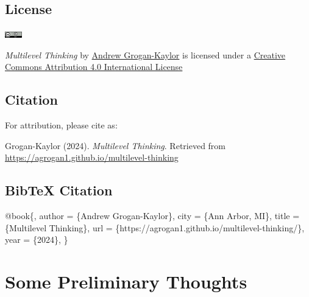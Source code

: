 \documentclass[
  letterpaper,
  DIV=11,
  numbers=noendperiod]{scrreprt}
\newenvironment{Shaded}{\begin{snugshade}}{\end{snugshade}}
\newcommand{\NormalTok}[1]{\textcolor[rgb]{0.00,0.23,0.31}{#1}}
\begin{document}

\section*{License}\label{license}


\includegraphics[width=0.29in,height=\textheight]{88x31.png}

\emph{Multilevel Thinking} by \href{https://agrogan1.github.io/}{Andrew
Grogan-Kaylor} is licensed under a
\href{http://creativecommons.org/licenses/by/4.0/}{Creative Commons
Attribution 4.0 International License}

\section*{Citation}\label{citation}


For attribution, please cite as:

Grogan-Kaylor (2024). \emph{Multilevel Thinking}. Retrieved from
\url{https://agrogan1.github.io/multilevel-thinking}

\section*{BibTeX Citation}\label{bibtex-citation}


\begin{Shaded}
\begin{Highlighting}[]
\NormalTok{@book\{,}
\NormalTok{   author = \{Andrew Grogan{-}Kaylor\},}
\NormalTok{   city = \{Ann Arbor, MI\},}
\NormalTok{   title = \{Multilevel Thinking\},}
\NormalTok{   url = \{https://agrogan1.github.io/multilevel{-}thinking/\},}
\NormalTok{   year = \{2024\},}
\NormalTok{\}}
\end{Highlighting}
\end{Shaded}


\chapter*{Some Preliminary Thoughts}\label{some-preliminary-thoughts}
\end{document}

